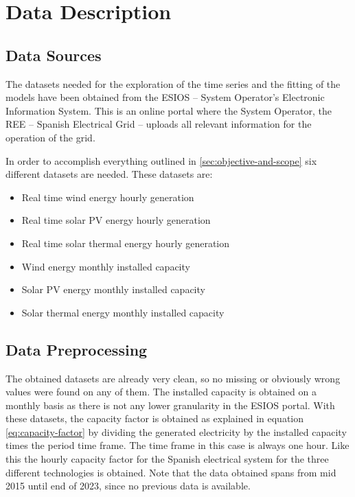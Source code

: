 \section{Data Description}
\label{sec:data-description}
\subsection{Data Sources}
The datasets needed for the exploration of the time series and the fitting of the models have been obtained from the ESIOS -- System Operator's Electronic Information System. This is an online portal where the System Operator, the REE -- Spanish Electrical Grid -- uploads all relevant information for the operation of the grid. 

In order to accomplish everything outlined in \autoref{sec:objective-and-scope} six different datasets are needed. These datasets are:
\begin{itemize}
    \item Real time wind energy hourly generation
    \item Real time solar PV energy hourly generation
    \item Real time solar thermal energy hourly generation
    \item Wind energy monthly installed capacity
    \item Solar PV energy monthly installed capacity
    \item Solar thermal energy monthly installed capacity
\end{itemize}


\subsection{Data Preprocessing}
The obtained datasets are already very clean, so no missing or obviously wrong values were found on any of them. The installed capacity is obtained on a monthly basis as there is not any lower granularity in the ESIOS portal. With these datasets, the capacity factor is obtained as explained in equation \eqref{eq:capacity-factor} by dividing the generated electricity by the installed capacity times the period time frame. The time frame in this case is always one hour. Like this the hourly capacity factor for the Spanish electrical system for the three different technologies is obtained. Note that the data obtained spans from mid 2015 until end of 2023, since no previous data is available. 

